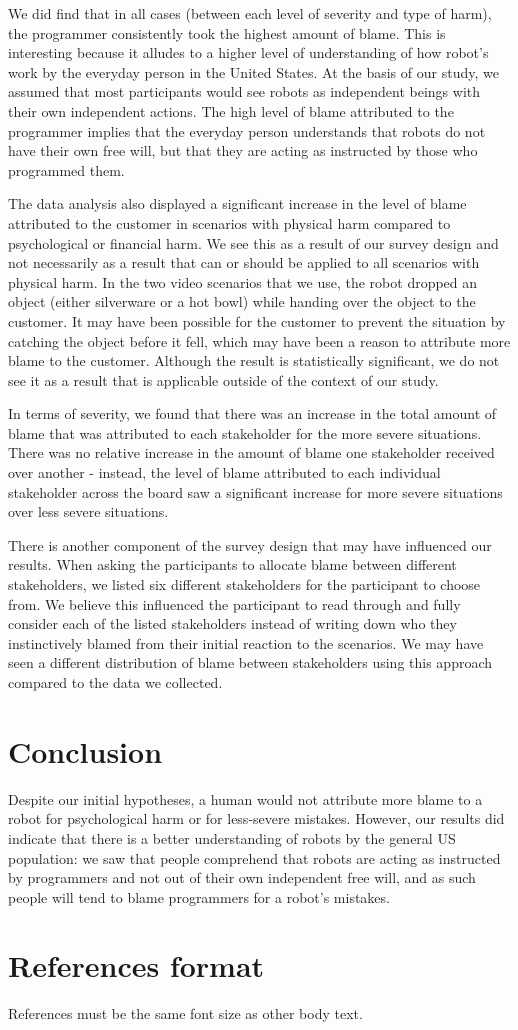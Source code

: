 \documentclass{sigchi}
\begin{document}
We did find that in all cases (between each level of severity and type of harm), the programmer consistently took the highest amount of blame. This is interesting because it alludes to a higher level of understanding of how robot's work by the everyday person in the United States. At the basis of our study, we assumed that most participants would see robots as independent beings with their own independent actions. The high level of blame attributed to the programmer implies that the everyday person understands that robots do not have their own free will, but that they are acting as instructed by those who programmed them.

The data analysis also displayed a significant increase in the level of blame attributed to the customer in scenarios with physical harm compared to psychological or financial harm. We see this as a result of our survey design and not necessarily as a result that can or should be applied to all scenarios with physical harm. In the two video scenarios that we use, the robot dropped an object (either silverware or a hot bowl) while handing over the object to the customer. It may have been possible for the customer to prevent the situation by catching the object before it fell, which may have been a reason to attribute more blame to the customer. Although the result is statistically significant, we do not see it as a result that is applicable outside of the context of our study.

In terms of severity, we found that there was an increase in the total amount of blame that was attributed to each stakeholder for the more severe situations. There was no relative increase in the amount of blame one stakeholder received over another - instead, the level of blame attributed to each individual stakeholder across the board saw a significant increase for more severe situations over less severe situations. 

There is another component of the survey design that may have influenced our results. When asking the participants to allocate blame between different stakeholders, we listed six different stakeholders for the participant to choose from. We believe this influenced the participant to read through and fully consider each of the listed stakeholders instead of writing down who they instinctively blamed from their initial reaction to the scenarios. We may have seen a different distribution of blame between stakeholders using this approach compared to the data we collected.

\section{Conclusion}
Despite our initial hypotheses, a human would not attribute more blame to a robot for psychological harm or for less-severe mistakes. However, our results did indicate that there is a better understanding of robots by the general US population: we saw that people comprehend that robots are acting as instructed by programmers and not out of their own independent free will, and as such people will tend to blame programmers for a robot's mistakes.

\section{References format}
References must be the same font size as other body text.


\end{document}
